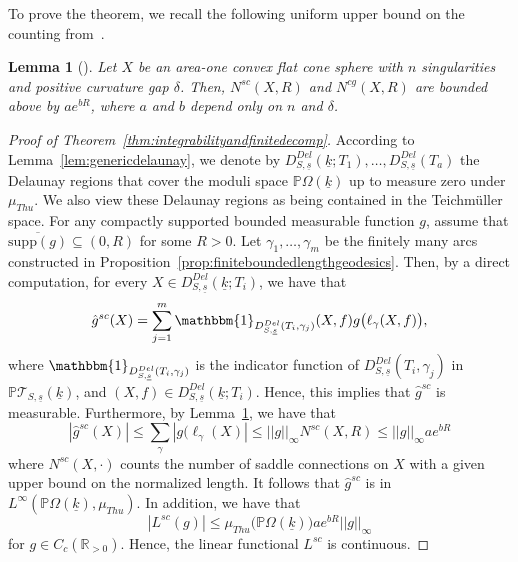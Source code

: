 \documentclass{compositio}
\numberwithin{equation}{section}
\numberwithin{figure}{section}
\theoremstyle{definition}
\theoremstyle{plain}
\newtheorem{lemma}[definition]{Lemma}
\begin{document}
{To prove the theorem, we recall the following uniform upper bound on the counting from~\cite{fu2024uniformlengthestimatestrajectories}.
\begin{lemma}[{\cite[Corollary~1.10]{fu2024uniformlengthestimatestrajectories}}]\label{lem:uniformupperbound}
    Let $X$ be an area-one convex flat cone sphere with $n$ singularities and positive curvature gap $\delta$. Then, $N^{sc}(X,R)$ and $N^{cg}(X,R)$ are bounded above by $ae^{bR}$, where $a$ and $b$ depend only on $n$ and $\delta$.
\end{lemma}

\begin{proof}[Proof of Theorem~\ref{thm:integrabilityandfinitedecomp}]
    According to Lemma~\ref{lem:genericdelaunay}, we denote by $D_{S,\underline{s}}^{Del}(\underline{k};T_1),\ldots,D_{S,\underline{s}}^{Del}(T_a)$ the Delaunay regions that cover the moduli space $\mathbb{P}\Omega(\underline{k})$ up to measure zero under $\mu_{Thu}$. We also view these Delaunay regions as being contained in the Teichm\"uller space. For any compactly supported bounded measurable function $g$, assume that $\overline{\mathrm{supp}(g)}\subseteq (0, R)$ for some $R>0$. Let $\gamma_1,\ldots,\gamma_m$ be the finitely many arcs constructed in Proposition~\ref{prop:finiteboundedlengthgeodesics}. Then, by a direct computation, for every $X\in D_{S,\underline{s}}^{Del}(\underline{k};T_i)$, we have that
    \begin{equation}\label{equ:measurable}
         \hat{g}^{sc}(X) = \sum_{j=1}^{m}\mathbbm{1}_{D_{S,\underline{s}}^{Del}(T_i,\gamma_j)}(X, f)g\big(\ell_{\gamma}(X,f)\big),
    \end{equation} 
    where $\mathbbm{1}_{D_{S,\underline{s}}^{Del}(T_i,\gamma_j)}$ is the indicator function of $D_{S,\underline{s}}^{Del}(T_i,\gamma_j)$ in $\mathbb{P}\mathcal{T}_{S, \underline{s}}(\underline{k})$, and $(X,f)\in D_{S,\underline{s}}^{Del}(\underline{k};T_i)$. Hence, 
    this implies that $\hat{g}^{sc}$ is measurable. Furthermore, by Lemma~\ref{lem:uniformupperbound}, we have that 
    $$|\hat{g}^{sc}(X)|\le \sum\limits_{\gamma} |g(\ell_{\gamma}(X)|\le||g||_{\infty}N^{sc}(X,R)\le ||g||_{\infty}ae^{bR}$$
    where $N^{sc}(X,\cdot)$ counts the number of saddle connections on $X$ with a given upper bound on the normalized length. It follows that $\hat{g}^{sc}$ is in $L^{\infty}(\mathbb{P}\Omega(\underline k),\mu_{Thu})$. In addition, we have that 
    $$
    |L^{sc}(g)|\le \mu_{Thu}\big(\mathbb{P}\Omega(\underline{k})\big)ae^{bR}||g||_{\infty}
    $$
    for $g\in C_c(\mathbb{R}_{>0})$. Hence, the linear functional $L^{sc}$ is continuous.
    

\end{proof}}
\end{document}

